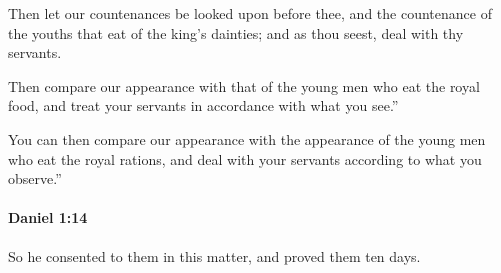 			\begin{versebox}
					\item[BHS] 
					\item[LXX] 
					\item[ASV] Then let our countenances be looked upon before thee, and the countenance of the youths that eat of the king's dainties; and as thou seest, deal with thy servants.
					\item[NIV] Then compare our appearance with that of the young men who eat the royal food, and treat your servants in accordance with what you see.”
					\item[NRSV] You can then compare our appearance with the appearance of the young men who eat the royal rations, and deal with your servants according to what you observe.”
			\end{versebox}

		\paragraph{Daniel 1:14} %
			\label{DANIEL-1-14}

			So he consented to them in this matter, and proved them ten days.

